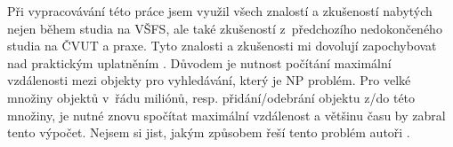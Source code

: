 Při vypracovávání této práce jsem využil všech znalostí a zkušeností nabytých nejen během studia na VŠFS, ale také zkušeností z~předchozího nedokončeného studia na ČVUT a praxe. Tyto znalosti a zkušenosti mi dovolují zapochybovat nad praktickým uplatněním .
Důvodem je nutnost počítání maximální vzdálenosti mezi objekty pro vyhledávání, který je NP problém.
Pro velké množiny objektů v~řádu miliónů, resp. přidání/odebrání objektu z/do této množiny, je nutné znovu spočítat maximální vzdálenost a většinu času by zabral tento výpočet.
Nejsem si jist, jakým způsobem řeší tento problém autoři .